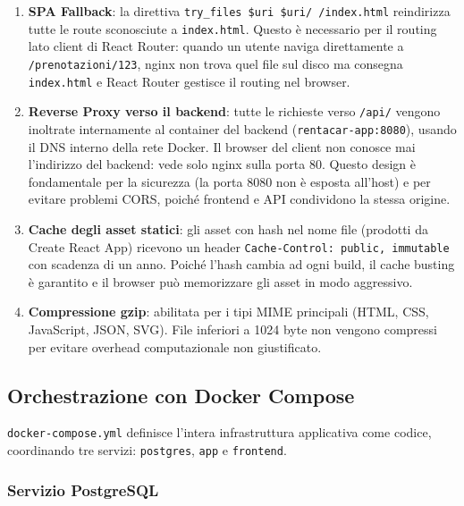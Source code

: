 \documentclass[12pt, a4paper]{article}
\begin{document}
    \begin{enumerate}
        \item \textbf{SPA Fallback}: la direttiva \texttt{try\_files \$uri \$uri/ /index.html}
        reindirizza tutte le route sconosciute a \texttt{index.html}. Questo è necessario
        per il routing lato client di React Router: quando un utente naviga direttamente a
        \texttt{/prenotazioni/123}, nginx non trova quel file sul disco ma consegna
        \texttt{index.html} e React Router gestisce il routing nel browser.

        \item \textbf{Reverse Proxy verso il backend}: tutte le richieste verso
        \texttt{/api/} vengono inoltrate internamente al container del backend
        (\texttt{rentacar-app:8080}), usando il DNS interno della rete Docker. Il browser
        del client non conosce mai l'indirizzo del backend: vede solo nginx sulla porta 80.
        Questo design è fondamentale per la sicurezza (la porta 8080 non è esposta all'host)
        e per evitare problemi CORS, poiché frontend e API condividono la stessa origine.

        \item \textbf{Cache degli asset statici}: gli asset con hash nel nome file (prodotti
        da Create React App) ricevono un header \texttt{Cache-Control: public, immutable}
        con scadenza di un anno. Poiché l'hash cambia ad ogni build, il cache busting è
        garantito e il browser può memorizzare gli asset in modo aggressivo.

        \item \textbf{Compressione gzip}: abilitata per i tipi MIME principali (HTML, CSS,
        JavaScript, JSON, SVG). File inferiori a 1024 byte non vengono compressi per evitare
        overhead computazionale non giustificato.
    \end{enumerate}

    \subsection{Orchestrazione con Docker Compose}

    \texttt{docker-compose.yml} definisce l'intera infrastruttura applicativa come codice,
    coordinando tre servizi: \texttt{postgres}, \texttt{app} e \texttt{frontend}.

    \subsubsection{Servizio PostgreSQL}
\end{document}

